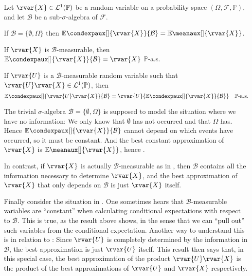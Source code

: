 \documentclass[article, a4paper, 11pt, oneside]{memoir}
\numberwithin{equation}{chapter}
\newcommand{\calB}{\mathcal{B}}
\newcommand{\calF}{\mathcal{F}}
\newcommand{\calL}{\mathcal{L}}
\renewcommand{\P}{\mathbb{P}}
\renewcommand{\mean}[2][]{\mathbb{E}\meanaux[#1]{#2}}
\newcommand{\condexp}[3][]{{\mathbb{E}\condexpaux[#1]{#2}{#3}}}
\begin{document}
\begin{proposition}
    Let $\rvar{X} \in \calL^1(\P)$ be a random variable on a probability space $(\Omega, \calF, \P)$, and let $\calB$ be a sub-$\sigma$-algebra of $\calF$.
    \begin{enumprop}
        \item \label{enum:conditional-expectation-no-information} If $\calB = \{\emptyset, \Omega\}$ then $\condexp{\rvar{X}}{\calB} = \mean{\rvar{X}}$.

        \item \label{enum:conditional-expectation-all-information} If $\rvar{X}$ is $\calB$-measurable, then $\condexp{\rvar{X}}{\calB} = \rvar{X}$ $\P$-a.s.

        \item \label{enum:conditional-expectation-constant} If $\rvar{U}$ is a $\calB$-measurable random variable such that $\rvar{U}\rvar{X} \in \calL^1(\P)$, then
        \begin{equation*}
            \condexp{\rvar{U}\rvar{X}}{\calB}
                = \rvar{U} \condexp{\rvar{X}}{\calB}
                \quad \text{$\P$-a.s.}
        \end{equation*}
    \end{enumprop}
\end{proposition}
%
The trivial $\sigma$-algebra $\calB = \{\emptyset, \Omega\}$ is supposed to model the situation where we have no information: We only know that $\emptyset$ has not occurred and that $\Omega$ has. Hence $\condexp{\rvar{X}}{\calB}$ cannot depend on which events have occurred, so it must be constant. And the best constant approximation of $\rvar{X}$ is $\mean{\rvar{X}}$, hence .

In contrast, if $\rvar{X}$ is actually $\calB$-measurable as in , then $\calB$ contains all the information necessary to determine $\rvar{X}$, and the best approximation of $\rvar{X}$ that only depends on $\calB$ is just $\rvar{X}$ itself.

Finally consider the situation in . One sometimes hears that $\calB$-measurable variables are \enquote{constant} when calculating conditional expectations with respect to $\calB$. This is true, as the result above shows, in the sense that we can \enquote{pull out} such variables from the conditional expectation. Another way to understand this is in relation to : Since $\rvar{U}$ is completely determined by the information in $\calB$, the best approximation is just $\rvar{U}$ itself. This result then says that, in this special case, the best approximation of the product $\rvar{U}\rvar{X}$ is the product of the best approximations of $\rvar{U}$ and $\rvar{X}$ respectively.
\end{document}
